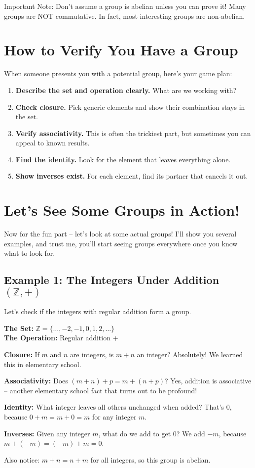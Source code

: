 \documentclass[12pt]{article}
\begin{document}
Important Note: Don't assume a group is abelian unless you can prove it! Many groups are NOT commutative. In fact, most interesting groups are non-abelian.

\section{\textcolor{SectionColor}{How to Verify You Have a Group}}

When someone presents you with a potential group, here's your game plan:

\begin{enumerate}
\item \textbf{Describe the set and operation clearly.} What are we working with?
\item \textbf{Check closure.} Pick generic elements and show their combination stays in the set.
\item \textbf{Verify associativity.} This is often the trickiest part, but sometimes you can appeal to known results.
\item \textbf{Find the identity.} Look for the element that leaves everything alone.
\item \textbf{Show inverses exist.} For each element, find its partner that cancels it out.
\end{enumerate}

\section{\textcolor{SectionColor}{Let's See Some Groups in Action!}}

Now for the fun part – let's look at some actual groups! I'll show you several examples, and trust me, you'll start seeing groups everywhere once you know what to look for.

\subsection{\textcolor{HeaderColor}{Example 1: The Integers Under Addition $(\mathbb{Z},+)$}}

\begin{examplebox}
Let's check if the integers with regular addition form a group.

\textbf{The Set:} $\mathbb{Z} = \{\ldots, -2, -1, 0, 1, 2, \ldots\}$ \\
\textbf{The Operation:} Regular addition $+$

\textbf{Closure:} If $m$ and $n$ are integers, is $m+n$ an integer? Absolutely! We learned this in elementary school.

\textbf{Associativity:} Does $(m+n)+p = m+(n+p)$? Yes, addition is associative – another elementary school fact that turns out to be profound!

\textbf{Identity:} What integer leaves all others unchanged when added? That's $0$, because $0+m = m+0 = m$ for any integer $m$.

\textbf{Inverses:} Given any integer $m$, what do we add to get $0$? We add $-m$, because $m+(-m) = (-m)+m = 0$.

Also notice: $m+n = n+m$ for all integers, so this group is abelian.
\end{examplebox}
\end{document}
